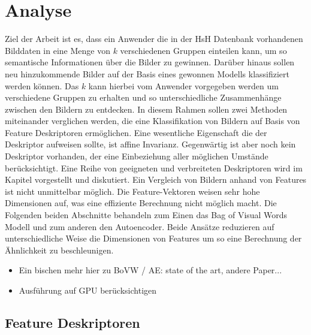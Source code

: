 \chapter{Analyse}

Ziel der Arbeit ist es, dass ein Anwender die in der HsH Datenbank vorhandenen Bilddaten in eine Menge von $k$ verschiedenen Gruppen einteilen kann, um so semantische Informationen über die Bilder zu gewinnen. Darüber hinaus sollen neu hinzukommende Bilder auf der Basis eines gewonnen Modells klassifiziert werden können. Das $k$ kann hierbei vom Anwender vorgegeben werden um verschiedene Gruppen zu erhalten und so unterschiedliche Zusammenhänge zwischen den Bildern zu entdecken. 
In diesem Rahmen sollen zwei Methoden miteinander verglichen werden, die eine Klassifikation von Bildern auf Basis von Feature Deskriptoren ermöglichen. Eine wesentliche Eigenschaft die der Deskriptor aufweisen sollte, ist affine Invarianz. Gegenwärtig ist aber noch kein Deskriptor vorhanden, der eine Einbeziehung aller möglichen Umstände berücksichtigt. Eine Reihe von geeigneten und verbreiteten Deskriptoren wird im Kapitel  vorgestellt und diskutiert.
Ein Vergleich von Bildern anhand von Features ist nicht unmittelbar möglich. Die Feature-Vektoren weisen sehr hohe Dimensionen auf, was eine effiziente Berechnung nicht möglich macht. Die Folgenden beiden Abschnitte behandeln zum Einen das Bag of Visual Words Modell und zum anderen den Autoencoder. Beide Ansätze reduzieren auf unterschiedliche Weise die Dimensionen von Features um so eine Berechnung der Ähnlichkeit zu beschleunigen. 

\begin{itemize}
	\item Ein bischen mehr hier zu BoVW / AE: state of the art, andere Paper...
	\item Ausführung auf GPU berücksichtigen
\end{itemize}

\section{Feature Deskriptoren}
\label{extraction}

